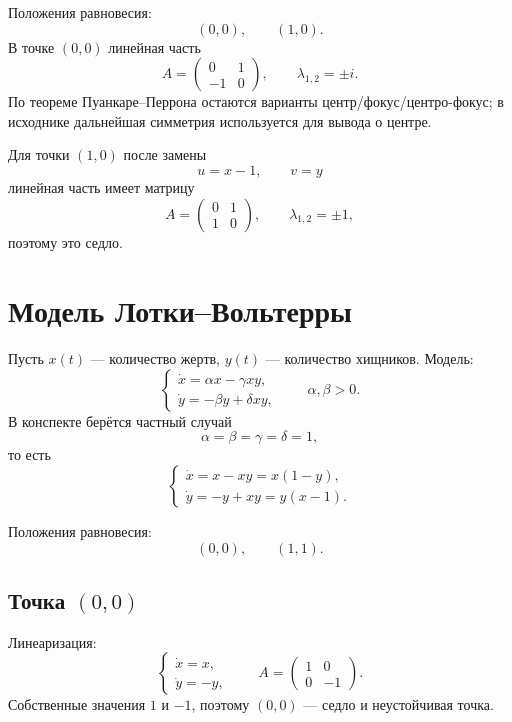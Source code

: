 \documentclass[12pt,a4paper]{article}
\numberwithin{equation}{section}
\begin{document}
\begin{exampleHSE}[Система $\dot x=y$, $\dot y=-x+x^2$]
Положения равновесия:
\[
(0,0),\qquad(1,0).
\]
В точке $(0,0)$ линейная часть
\[
A=\begin{pmatrix}0&1\\-1&0\end{pmatrix},
\qquad \lambda_{1,2}=\pm i.
\]
По теореме Пуанкаре--Перрона остаются варианты центр/фокус/центро-фокус; в исходнике дальнейшая симметрия используется для вывода о центре.

Для точки $(1,0)$ после замены
\[
u=x-1,\qquad v=y
\]
линейная часть имеет матрицу
\[
A=\begin{pmatrix}0&1\\1&0\end{pmatrix},
\qquad \lambda_{1,2}=\pm1,
\]
поэтому это седло.
\end{exampleHSE}

\section[Лотка--Вольтерра]{Модель Лотки--Вольтерры}

Пусть $x(t)$ --- количество жертв, $y(t)$ --- количество хищников. Модель:
\[
\begin{cases}
\dot x=\alpha x-\gamma xy,\\
\dot y=-\beta y+\delta xy,
\end{cases}
\qquad \alpha,\beta>0.
\]
В конспекте берётся частный случай
\[
\alpha=\beta=\gamma=\delta=1,
\]
то есть
\begin{equation}
\begin{cases}
\dot x=x-xy=x(1-y),\\
\dot y=-y+xy=y(x-1).
\end{cases}
\label{eq:lotka}
\end{equation}

Положения равновесия:
\[
(0,0),\qquad(1,1).
\]

\subsection{Точка \texorpdfstring{$(0,0)$}{(0,0)}}
Линеаризация:
\[
\begin{cases}
\dot x=x,\\
\dot y=-y,
\end{cases}
\qquad
A=\begin{pmatrix}1&0\\0&-1\end{pmatrix}.
\]
Собственные значения $1$ и $-1$, поэтому $(0,0)$ --- седло и неустойчивая точка.
\end{document}
